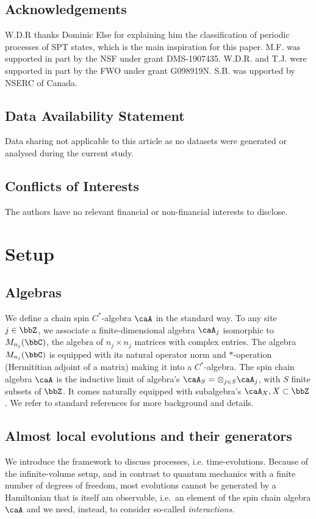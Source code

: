 \subsection*{Acknowledgements}
W.D.R thanks Dominic Else for explaining him the classification of periodic processes of SPT states, which is the main inspiration for this paper.    M.F. was supported in part by the NSF under grant DMS-1907435. W.D.R. and T.J. were supported in part by the FWO under grant G098919N. S.B. was upported by NSERC of Canada.

\subsection*{Data Availability Statement} Data sharing not applicable to this article as no datasets were generated or analysed during the current study.

\subsection*{Conflicts of Interests} The authors have no relevant financial or non-financial interests to disclose.



\section{Setup}   \label{sec: setup}
\subsection{Algebras}
We define a chain spin $C^*$-algebra $\caA$ in the standard way.
To any site $j \in \bbZ$, we associate a finite-dimensional algebra $\caA_j$ isomorphic to  $M_{n_j}(\bbC)$, the algebra of $n_j\times n_j$ matrices with complex entries. The algebra $M_{n_j}(\bbC)$ is equipped with its natural operator norm and $*$-operation (Hermititian adjoint of a matrix) making it into a $C^*$-algebra.  The spin chain algebra $\caA$ is the inductive limit of 
algebra's $\caA_S=\otimes_{j\in S} \caA_j$, with  $S$ finite subsets of $\bbZ$. 
It comes naturally equipped with subalgebra's $\caA_X, X\subset \bbZ$. We refer to standard references \cite{BratRob2,simon2014statistical,naaijkens2017quantum} for more background and details.





\subsection{Almost local evolutions and their generators}
We introduce the framework to discuss processes, i.e. time-evolutions.  Because of the infinite-volume setup, and in contrast to quantum mechanics with a finite number of degrees of freedom, most evolutions cannot be generated by a Hamiltonian that is itself am observable, i.e.\ an element of the  spin chain algebra $\caA$ and we need, instead, to consider so-called \emph{interactions}.  

